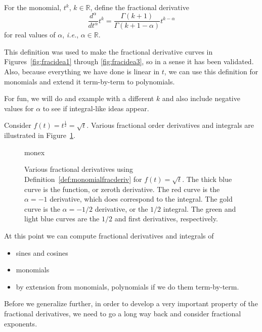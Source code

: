 \begin{definition}
  For the monomial, $t^k$, $k \in \mathbb R$, define the fractional derivative 
  \begin{equation}
    \frac{d^\alpha}{dt^\alpha} t^k = \frac{\Gamma\left( k + 1 \right)}{\Gamma \left( k + 1 - \alpha \right)} t^{k - \alpha}
    \label{eq:monomialfrac}
  \end{equation}
  for real values of $\alpha$, \textit{i.e.}, $\alpha \in \mathbb R$.
  \label{def:monomialfracderiv}
\end{definition}

This definition was used to make the fractional derivative curves in Figures~\ref{fig:fracidea1} through
\ref{fig:fracidea3}, so in a sense it has been validated. Also, because everything we have done is linear in $t$, we can
use this definition for monomials and extend it term-by-term to polynomials. 

For fun, we will do and example with a different $k$ and also include negative values for $\alpha$ to see if integral-like ideas appear.

\begin{example}
  Consider $f(t) = t^\frac{1}{2} = \sqrt{t}$. Various fractional order derivatives and integrals are illustrated in Figure~\ref{fig:monex}.

  \begin{figure}
    \centering
    {monex}
    \caption{Various fractional derivatives using Definition~\ref{def:monomialfracderiv} for $f(t) = \sqrt{t}$. The thick blue curve is the function, or zeroth derivative. The red curve is the $\alpha = -1$ derivative, which does correspond to the integral. The gold curve is the $\alpha = -1/2$ derivative, or the $1/2$ integral. The green and light blue curves are the $1/2$ and first derivatives, respectively.}
    \label{fig:monex}
  \end{figure}
\end{example}

At this point we can compute fractional derivatives and integrals of
\begin{itemize}
  \item sines and cosines
  \item monomials
  \item by extension from monomials, polynomials if we do them term-by-term.
\end{itemize}

Before we generalize further, in order to develop a very important property of the fractional derivatives, we need to go a long way back and consider fractional exponents.


